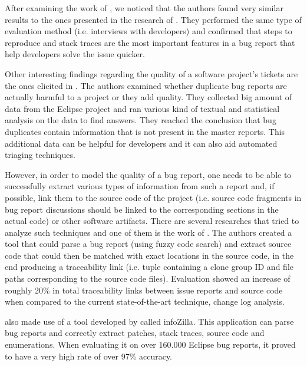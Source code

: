 \documentclass[11pt,english,twocolumn]{article}
\begin{document}
After examining the work of \cite{bettenburg2007quality}, we noticed that
the authors found very similar results to the ones presented in the research of \cite{bettenburg2008makes}. 
They performed the same type of evaluation method (i.e. 
interviews with developers) and confirmed that steps to reproduce and stack traces
are the most important features in a bug report that help developers solve the
issue quicker.

Other interesting findings regarding the quality of a software project's tickets
are the ones elicited in \cite{bettenburg2008duplicate}. The authors examined
whether duplicate bug reports are actually harmful to a project or they add 
quality. They collected big amount of data from the Eclipse project and ran
various kind of textual and statistical analysis on the data to find answers.
They reached the conclusion that bug duplicates contain information that is not
present in the master reports. This additional data can be helpful for developers
and it can also aid automated triaging techniques.

However, in order to model the quality of a bug report, one needs to be able to
successfully extract various types of information from such a report and, if 
possible, link them to the source code of the project (i.e. source code fragments
in bug report discussions should be linked to the corresponding sections in the 
actual code) or other software artifacts. There are several researches that tried 
to analyze such techniques and one of them is the work of 
\cite{bettenburg2012using}. The authors created a tool that could parse a bug 
report (using fuzzy code search) and extract source code that could then be
matched with exact locations in the source code, in the end producing a 
traceability link (i.e. tuple containing a clone group ID and file paths 
corresponding to the source code files). Evaluation showed an increase of
roughly 20\% in total traceability links between issue reports and source code 
when compared to the current state-of-the-art technique, change log analysis.

\cite{bettenburg2012using} also made use of a tool developed by 
\cite{bettenburg2008extracting} called infoZilla. This application can
parse bug reports and correctly extract patches, stack traces, source code and
enumerations. When evaluating it on over 160.000 Eclipse bug reports, it proved to 
have a very high rate of over 97\% accuracy.
\end{document}
